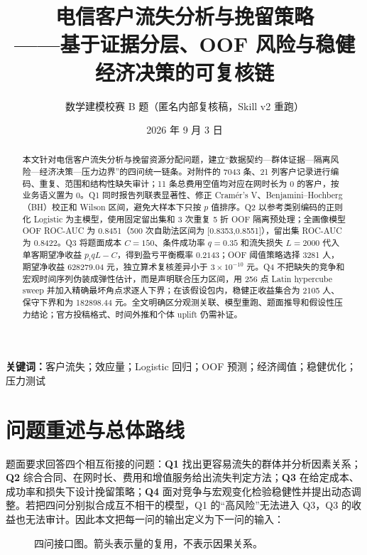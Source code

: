 \documentclass[UTF8,a4paper,11pt]{ctexart}
\title{\vspace{-0.9cm}\textbf{电信客户流失分析与挽留策略}\\[2mm]
  \large——基于证据分层、OOF 风险与稳健经济决策的可复核链}
\author{数学建模校赛 B 题\quad（匿名内部复核稿，Skill v2 重跑）}
\date{2026 年 9 月 3 日}
\begin{document}
\maketitle

\begin{abstract}
本文针对电信客户流失分析与挽留资源分配问题，建立“数据契约—群体证据—隔离风险—经济决策—压力边界”的四问统一链条。对附件的 7043 条、21 列客户记录进行编码、重复、范围和结构性缺失审计；11 条总费用空值均对应在网时长为 0 的客户，按业务语义置为 0。Q1 同时报告列联表显著性、修正 Cramér's V、Benjamini--Hochberg（BH）校正和 Wilson 区间，避免大样本下只按 \(p\) 值排序。Q2 以参考类别编码的正则化 Logistic 为主模型，使用固定留出集和 3 次重复 5 折 OOF 隔离预处理；全画像模型 OOF ROC-AUC 为 0.8451（500 次自助法区间为 [0.8353,0.8551]），留出集 ROC-AUC 为 0.8422。Q3 将题面成本 \(C=150\)、条件成功率 \(q=0.35\) 和流失损失 \(L=2000\) 代入单客期望净收益 \(p_iqL-C\)，得到盈亏平衡概率 \(0.2143\)；OOF 阈值策略选择 3281 人，期望净收益 628279.04 元，独立算术复核差异小于 \(3\times10^{-10}\) 元。Q4 不把缺失的竞争和宏观时间序列伪装成弹性估计，而是声明联合压力区间，用 256 点 Latin hypercube sweep 并加入精确最坏角点求逐人下界；在该假设包内，稳健正收益集合为 2105 人、保守下界和为 182898.44 元。全文明确区分观测关联、模型重跑、题面推导和假设性压力结论；官方投稿格式、时间外推和个体 uplift 仍需补证。
\end{abstract}

\noindent\textbf{关键词：}客户流失；效应量；Logistic 回归；OOF 预测；经济阈值；稳健优化；压力测试

\section{问题重述与总体路线}
\label{sec:overview}

题面要求回答四个相互衔接的问题：\textbf{Q1} 找出更容易流失的群体并分析因素关系；\textbf{Q2} 综合合同、在网时长、费用和增值服务给出流失判定方法；\textbf{Q3} 在给定成本、成功率和损失下设计挽留策略；\textbf{Q4} 面对竞争与宏观变化检验稳健性并提出动态调整。若把四问分别拟合成互不相干的模型，Q1 的“高风险”无法进入 Q3，Q3 的收益也无法审计。因此本文把每一问的输出定义为下一问的输入：

\begin{figure}[H]
\centering
{}
\caption{四问接口图。箭头表示量的复用，不表示因果关系。}
\label{fig:route-v2}
\end{figure}
\end{document}
